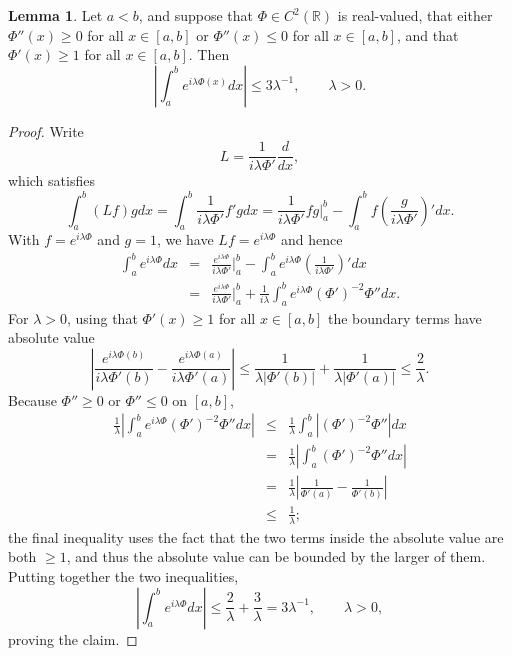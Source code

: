 \documentclass{article}
\theoremstyle{definition}
\newtheorem{lemma}[theorem]{Lemma}
\theoremstyle{definition}
\begin{document}
\begin{lemma}
Let $a<b$,
 and suppose that $\Phi \in C^2(\mathbb{R})$ is real-valued, that either $\Phi''(x) \geq 0$ for all $x \in [a,b]$ or $\Phi''(x) \leq 0$ for all $x \in [a,b]$,
 and   that $\Phi'(x) \geq 1$ for  all $x \in [a,b]$. 
 Then 
 \[
\left| \int_a^b e^{i\lambda \Phi(x)} dx \right| \leq 3 \lambda^{-1}, \qquad \lambda >0.
 \]
 \label{22}
\end{lemma}
\begin{proof}
Write
\[
L = \frac{1}{i \lambda \Phi'} \frac{d}{dx},
\]
which satisfies
\[
\int_a^b (Lf)g dx = \int_a^b  \frac{1}{i \lambda \Phi'} f' g dx =  \frac{1}{i \lambda \Phi'} f g \bigg|_a^b 
-\int_a^b f \left( \frac{g}{i \lambda \Phi'} \right)' dx.
\]
With $f=e^{i\lambda \Phi}$ and $g=1$, we have $Lf = e^{i\lambda \Phi}$ and hence
\begin{eqnarray*}
\int_a^b e^{i\lambda \Phi} dx &=& \frac{e^{i\lambda \Phi}}{i \lambda \Phi'} \bigg|_a^b - \int_a^b e^{i\lambda \Phi} \left( \frac{1}{i \lambda \Phi'} \right)' dx\\
&=& \frac{e^{i\lambda \Phi}}{i \lambda \Phi'} \bigg|_a^b  + \frac{1}{i\lambda} \int_a^b e^{i\lambda \Phi} (\Phi')^{-2} \Phi'' dx.
\end{eqnarray*}
For $\lambda>0$, using that $\Phi'(x) \geq 1$ for all $x \in [a,b]$ 
 the boundary terms have absolute value
 \[
\left|  \frac{e^{i\lambda \Phi(b)}}{i \lambda \Phi'(b)} -  \frac{e^{i\lambda \Phi(a)}}{i \lambda \Phi'(a)} \right|
\leq \frac{1}{\lambda |\Phi'(b)|} + \frac{1}{\lambda |\Phi'(a)|}
\leq \frac{2}{\lambda}.
\]
Because $\Phi'' \geq 0$ or $\Phi'' \leq 0$ on $[a,b]$,
\begin{eqnarray*}
\frac{1}{\lambda} \left| \int_a^b e^{i\lambda \Phi} (\Phi')^{-2} \Phi'' dx \right| 
&\leq& \frac{1}{\lambda} \int_a^b |  (\Phi')^{-2} \Phi''| dx\\
&=&\frac{1}{\lambda} \left| \int_a^b (\Phi')^{-2} \Phi'' dx \right| \\
&=&\frac{1}{\lambda} \left| \frac{1}{\Phi'(a)}- \frac{1}{\Phi'(b)} \right|\\
&\leq&\frac{1}{\lambda};
\end{eqnarray*}
the final inequality uses the fact that the two terms inside the absolute value are both $\geq 1$, and thus the absolute value can be bounded by the larger
of them.
Putting together the two inequalities,
\[
\left|\int_a^b e^{i\lambda \Phi} dx\right| \leq \frac{2}{\lambda}+\frac{3}{\lambda}= 3 \lambda^{-1}, \qquad \lambda>0,
\]
proving the claim.
\end{proof}
\end{document}
